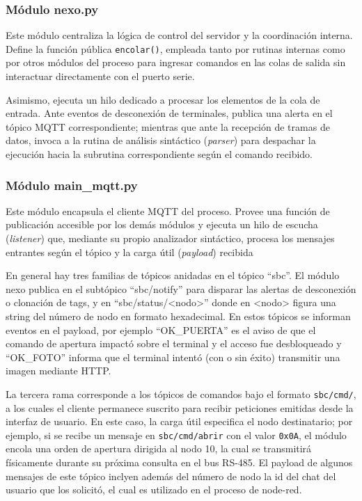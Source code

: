 \subsubsection{Módulo nexo.py}

Este módulo centraliza la lógica de control del servidor y la coordinación interna. Define la función pública \texttt{encolar()}, empleada tanto por rutinas internas como por otros módulos del proceso para ingresar comandos en las colas de salida sin interactuar directamente con el puerto serie.

Asimismo, ejecuta un hilo dedicado a procesar los elementos de la cola de entrada. Ante eventos de desconexión de terminales, publica una alerta en el tópico MQTT correspondiente; mientras que ante la recepción de tramas de datos, invoca a la rutina de análisis sintáctico (\textit{parser}) para despachar la ejecución hacia la subrutina correspondiente según el comando recibido.

\subsubsection{Módulo main\_mqtt.py}
Este módulo encapsula el cliente MQTT del proceso. Provee una función de publicación accesible por los demás módulos y ejecuta un hilo de escucha (\textit{listener}) que, mediante su propio analizador sintáctico, procesa los mensajes entrantes según el tópico y la carga útil (\textit{payload}) recibida

En general hay tres familias de tópicos anidadas en el tópico \enquote{sbc}.
El módulo nexo publica en el subtópico \enquote{sbc/notify} para disparar las alertas de desconexión o clonación de tags, y en \enquote{sbc/status/<nodo>} donde en <nodo> figura una string del número de nodo en formato hexadecimal. En estos tópicos se informan eventos en el payload, por ejemplo \enquote{OK\_PUERTA} es el aviso de que el comando de apertura impactó sobre el terminal y el acceso fue desbloqueado y \enquote{OK\_FOTO} informa que el terminal intentó (con o sin éxito) transmitir una imagen mediante HTTP.

La tercera rama corresponde a los tópicos de comandos bajo el formato \texttt{sbc/cmd/}, a los cuales el cliente permanece suscrito para recibir peticiones emitidas desde la interfaz de usuario. En este caso, la carga útil especifica el nodo destinatario; por ejemplo, si se recibe un mensaje en \texttt{sbc/cmd/abrir} con el valor \texttt{0x0A}, el módulo encola una orden de apertura dirigida al nodo 10, la cual se transmitirá físicamente durante su próxima consulta en el bus RS-485.
El payload de algunos mensajes de este tópico inclyen además del número de nodo la id del chat del usuario que los solicitó, el cual es utilizado en el proceso de node-red.

